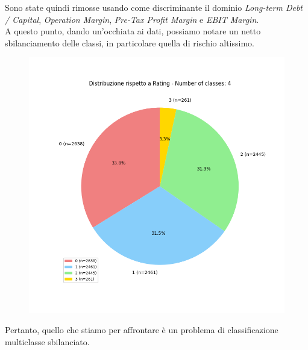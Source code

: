 \noindent Sono state quindi rimosse usando come discriminante il dominio \textit{Long-term Debt / Capital}, \textit{Operation Margin}, \textit{Pre-Tax Profit Margin} e \textit{EBIT Margin}. \\ A questo punto, dando un'occhiata ai dati, possiamo notare un netto sbilanciamento delle classi, in particolare quella di rischio altissimo.
\begin{figure}[H]
    \centering
    \includegraphics[scale=0.5]{img/class_imbalance.png}
\end{figure}
\noindent Pertanto, quello che stiamo per affrontare è un problema di classificazione multiclasse sbilanciato.